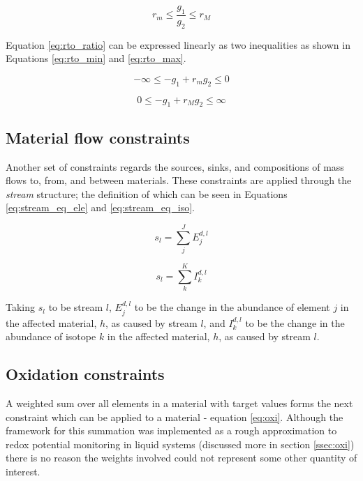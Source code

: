 \begin{equation}
\label{eq:rto_ratio}
r_{m} \leq \frac{g_{1}}{g_{2}} \leq r_{M} 
\end{equation}

Equation \ref{eq:rto_ratio} can be expressed linearly as two inequalities as
shown in Equations \ref{eq:rto_min} and \ref{eq:rto_max}.

\begin{equation}
\label{eq:rto_min}
-\infty \leq -g_{1} + r_{m}g_{2} \leq 0
\end{equation}

\begin{equation}
\label{eq:rto_max}
0 \leq -g_{1} + r_{M}g_{2} \leq \infty
\end{equation}


\subsection{Material flow constraints} \label{ssec:stream_eq}
Another set of constraints regards the sources, sinks, and compositions of mass
flows to, from, and between materials. These constraints are applied through 
the \textit{stream} structure; the definition of which can be
seen in Equations \ref{eq:stream_eq_ele} and \ref{eq:stream_eq_iso}.

\begin{equation}
\label{eq:stream_eq_ele}
s_{l} = \sum \limits_{j}^{J} E_{j}^{d,l}
\end{equation}

\begin{equation}
\label{eq:stream_eq_iso}
s_{l} = \sum \limits_{k}^{K} I_{k}^{d,l}
\end{equation}

Taking $s_{l}$ to be stream $l$, $E_{j}^{d,l}$ to be the change in the 
abundance of element $j$ in the affected material, $h$, as caused by stream $l$,
and $I_{k}^{d,l}$ to be 
the change in the abundance of isotope $k$ in the affected material, $h$, as
caused by stream $l$.

\subsection{Oxidation constraints} \label{ssec:oxid_eq}
A weighted sum over all elements in a material with target values forms the 
next constraint which can be applied to a material - equation \ref{eq:oxi}. 
Although the framework for this summation was implemented as a rough 
approximation to redox potential
monitoring in liquid systems (discussed more in section \ref{ssec:oxi}) there is
no reason the weights involved could not represent some other quantity of 
interest. 

